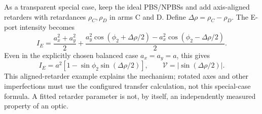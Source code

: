 As a transparent special case, keep the ideal PBS/NPBSs and add axis-aligned
retarders with retardances $\rho_C,\rho_D$ in arms C and D. Define
$\Delta\rho=\rho_C-\rho_D$. The E-port intensity becomes
\begin{equation}
I_E=\frac{a_x^2+a_y^2}{2}
+\frac{a_y^2\cos(\phi_2+\Delta\rho/2)
-a_x^2\cos(\phi_2-\Delta\rho/2)}{2}.
\end{equation}
Even in the explicitly chosen balanced case $a_x=a_y=a$, this gives
\begin{equation}
I_E=a^2[1-\sin\phi_2\sin(\Delta\rho/2)],\qquad
\mathcal V=|\sin(\Delta\rho/2)|.
\end{equation}
This aligned-retarder example explains the mechanism; rotated axes and other
imperfections must use the configured transfer calculation, not this special-case
formula. A fitted retarder parameter is not, by itself, an independently
measured property of an optic.
